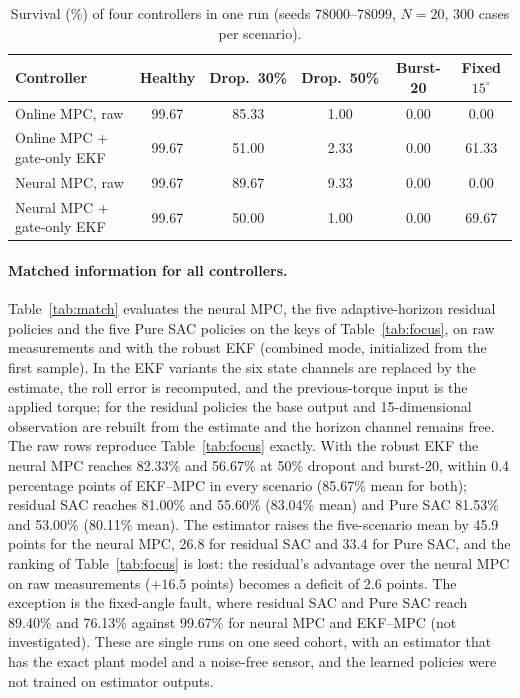 \documentclass[preprint,12pt,authoryear=false]{elsarticle}
\theoremstyle{remark}\newtheorem{remark}{Remark}
\theoremstyle{plain}\newtheorem{proposition}{Proposition}\newtheorem{lemma}{Lemma}
\theoremstyle{definition}\newtheorem{assumption}{Assumption}
\begin{document}
\begin{table}[t]\centering\small
\caption{Survival (\%) of four controllers in one run (seeds 78000--78099, $N=20$, 300 cases per scenario).}\label{tab:abl2}
\begin{tabular}{lccccc}\toprule
Controller & Healthy & Drop.\ 30\% & Drop.\ 50\% & Burst-20 & Fixed $15^\circ$\\\midrule
Online MPC, raw & 99.67 & 85.33 & 1.00 & 0.00 & 0.00\\
Online MPC + gate-only EKF & 99.67 & 51.00 & 2.33 & 0.00 & 61.33\\
Neural MPC, raw & 99.67 & 89.67 & 9.33 & 0.00 & 0.00\\
Neural MPC + gate-only EKF & 99.67 & 50.00 & 1.00 & 0.00 & 69.67\\\bottomrule
\end{tabular}
\end{table}

\paragraph{Matched information for all controllers.} Table~\ref{tab:match} evaluates the neural MPC, the five adaptive-horizon residual policies and the five Pure SAC policies on the keys of Table~\ref{tab:focus}, on raw measurements and with the robust EKF (combined mode, initialized from the first sample). In the EKF variants the six state channels are replaced by the estimate, the roll error is recomputed, and the previous-torque input is the applied torque; for the residual policies the base output and 15-dimensional observation are rebuilt from the estimate and the horizon channel remains free. The raw rows reproduce Table~\ref{tab:focus} exactly. With the robust EKF the neural MPC reaches 82.33\% and 56.67\% at 50\% dropout and burst-20, within 0.4 percentage points of EKF--MPC in every scenario (85.67\% mean for both); residual SAC reaches 81.00\% and 55.60\% (83.04\% mean) and Pure SAC 81.53\% and 53.00\% (80.11\% mean). The estimator raises the five-scenario mean by 45.9 points for the neural MPC, 26.8 for residual SAC and 33.4 for Pure SAC, and the ranking of Table~\ref{tab:focus} is lost: the residual's advantage over the neural MPC on raw measurements ($+16.5$ points) becomes a deficit of 2.6 points. The exception is the fixed-angle fault, where residual SAC and Pure SAC reach 89.40\% and 76.13\% against 99.67\% for neural MPC and EKF--MPC (not investigated). These are single runs on one seed cohort, with an estimator that has the exact plant model and a noise-free sensor, and the learned policies were not trained on estimator outputs.
\end{document}
